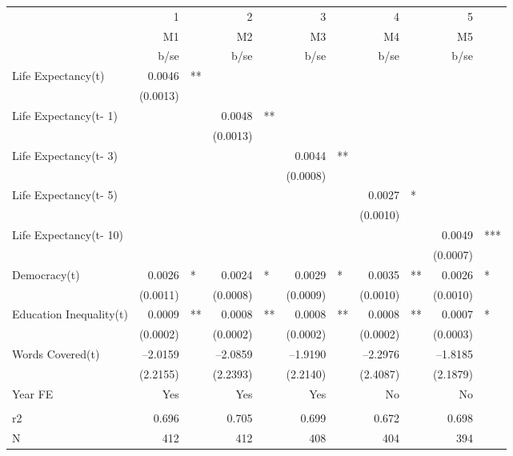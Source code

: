 \begin{tabular} {l* {5}{r @{} l}}
\hline
            &           1&   &           2&   &           3&   &           4&   &           5&   \\
            &          M1&   &          M2&   &          M3&   &          M4&   &          M5&   \\
            &        b/se&   &        b/se&   &        b/se&   &        b/se&   &        b/se&   \\
\hline
Life Expectancy(t)&      0.0046&** &            &   &            &   &            &   &            &   \\
            &    (0.0013)&   &            &   &            &   &            &   &            &   \\
Life Expectancy(t- 1)&            &   &      0.0048&** &            &   &            &   &            &   \\
            &            &   &    (0.0013)&   &            &   &            &   &            &   \\
Life Expectancy(t- 3)&            &   &            &   &      0.0044&** &            &   &            &   \\
            &            &   &            &   &    (0.0008)&   &            &   &            &   \\
Life Expectancy(t- 5)&            &   &            &   &            &   &      0.0027&*  &            &   \\
            &            &   &            &   &            &   &    (0.0010)&   &            &   \\
Life Expectancy(t- 10)&            &   &            &   &            &   &            &   &      0.0049&***\\
            &            &   &            &   &            &   &            &   &    (0.0007)&   \\
Democracy(t)&      0.0026&*  &      0.0024&*  &      0.0029&*  &      0.0035&** &      0.0026&*  \\
            &    (0.0011)&   &    (0.0008)&   &    (0.0009)&   &    (0.0010)&   &    (0.0010)&   \\
Education Inequality(t)&      0.0009&** &      0.0008&** &      0.0008&** &      0.0008&** &      0.0007&*  \\
            &    (0.0002)&   &    (0.0002)&   &    (0.0002)&   &    (0.0002)&   &    (0.0003)&   \\
Words Covered(t)&    --2.0159&   &    --2.0859&   &    --1.9190&   &    --2.2976&   &    --1.8185&   \\
            &    (2.2155)&   &    (2.2393)&   &    (2.2140)&   &    (2.4087)&   &    (2.1879)&   \\
Year FE     &         Yes&   &         Yes&   &         Yes&   &          No&   &          No&   \\
 \\
r2          &       0.696&   &       0.705&   &       0.699&   &       0.672&   &       0.698&   \\
N           &         412&   &         412&   &         408&   &         404&   &         394&   \\
\hline
\end{tabular}
